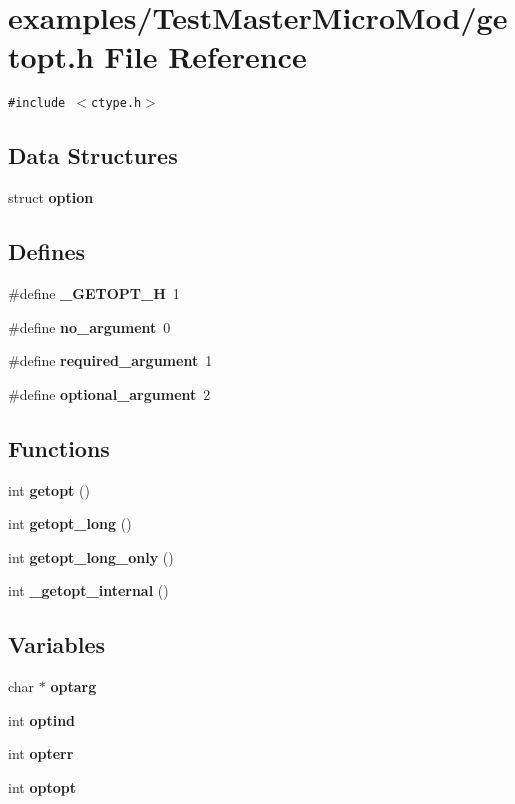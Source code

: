 \section{examples/Test\-Master\-Micro\-Mod/getopt.h File Reference}
\label{TestMasterMicroMod_2getopt_8h}
{\tt \#include $<$ctype.h$>$}\par
\subsection*{Data Structures}
\begin{CompactItemize}
\item 
struct {\bf option}
\end{CompactItemize}
\subsection*{Defines}
\begin{CompactItemize}
\item 
\#define {\bf \_\-GETOPT\_\-H}~1
\item 
\#define {\bf no\_\-argument}~0
\item 
\#define {\bf required\_\-argument}~1
\item 
\#define {\bf optional\_\-argument}~2
\end{CompactItemize}
\subsection*{Functions}
\begin{CompactItemize}
\item 
int {\bf getopt} ()
\item 
int {\bf getopt\_\-long} ()
\item 
int {\bf getopt\_\-long\_\-only} ()
\item 
int {\bf \_\-getopt\_\-internal} ()
\end{CompactItemize}
\subsection*{Variables}
\begin{CompactItemize}
\item 
char $\ast$ {\bf optarg}
\item 
int {\bf optind}
\item 
int {\bf opterr}
\item 
int {\bf optopt}
\end{CompactItemize}


